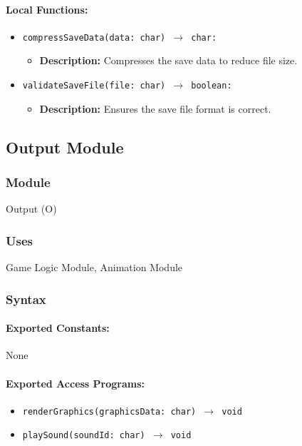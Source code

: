 \documentclass[12pt, titlepage]{article}
\begin{document}
\paragraph{Local Functions:}
\begin{itemize}
    \item \texttt{compressSaveData(data: char) $\to$ char:}
    \begin{itemize}
        \item \textbf{Description:} Compresses the save data to reduce file size.
    \end{itemize}
    \item \texttt{validateSaveFile(file: char) $\to$ boolean:}
    \begin{itemize}
        \item \textbf{Description:} Ensures the save file format is correct.
    \end{itemize}
\end{itemize}

\newpage

\subsection{Output Module}

\subsubsection{Module}
Output (O)

\subsubsection{Uses}
Game Logic Module, Animation Module

\subsubsection{Syntax}

\paragraph{Exported Constants:}
None

\paragraph{Exported Access Programs:}
\begin{itemize}
    \item \texttt{renderGraphics(graphicsData: char) $\to$ void}
    \item \texttt{playSound(soundId: char) $\to$ void}
\end{itemize}
\end{document}
